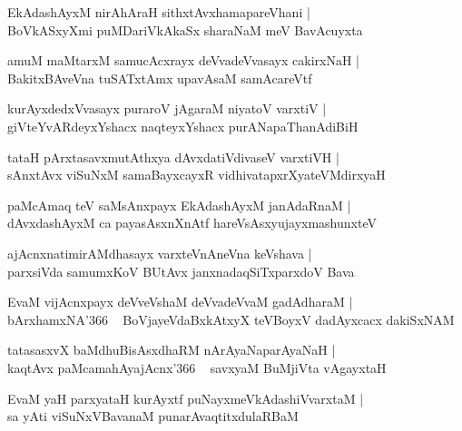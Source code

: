 \documentclass[twoside,12pt,openright]{book}
\newcounter{shloka}[chapter]
\begin{document}
\begin{shloka}%
EkAdashAyxM nirAhAraH sithxtAvxhamapareVhani |\\
BoVkASxyXmi puMDariVkAkaSx sharaNaM meV BavAcuyxta
\end{shloka}

\begin{shloka}%
amuM maMtarxM samucAcxrayx deVvadeVvasayx cakirxNaH |\\
BakitxBAveVna tuSATxtAmx upavAsaM samAcareVtf 
\end{shloka}

\begin{shloka}%
kurAyxdedxVvasayx puraroV jAgaraM niyatoV varxtiV |\\
giVteYvARdeyxYshacx naqteyxYshacx purANapaThanAdiBiH
\end{shloka}

\begin{shloka}%
tataH pArxtasavxmutAthxya dAvxdatiVdivaseV varxtiVH |\\
sAnxtAvx viSuNxM samaBayxcayxR vidhivatapxrXyateVMdirxyaH 
\end{shloka}

\begin{shloka}%
paMcAmaq teV saMsAnxpayx EkAdashAyxM janAdaRnaM |\\
dAvxdashAyxM ca payasAsxnXnAtf hareVsAsxyujayxmashunxteV 
\end{shloka}

\begin{shloka}%
ajAcnxnatimirAMdhasayx varxteVnAneVna keVshava |\\
parxsiVda samumxKoV BUtAvx janxnadaqSiTxparxdoV Bava
\end{shloka}

\begin{shloka}%
EvaM vijAcnxpayx deVveVshaM deVvadeVvaM gadAdharaM |\\
bArxhamxNA\char'366 ~ BoVjayeVdaBxkAtxyX teVBoyxV dadAyxcacx dakiSxNAM
\end{shloka}

\begin{shloka}%
tatasasxvX baMdhuBisAsxdhaRM nArAyaNaparAyaNaH |\\
kaqtAvx paMcamahAyajAcnx\char'366 ~ savxyaM BuMjiVta vAgayxtaH
\end{shloka}

\begin{shloka}%
EvaM yaH parxyataH kurAyxtf puNayxmeVkAdashiVvarxtaM |\\
sa yAti viSuNxVBavanaM punarAvaqtitxdulaRBaM
\end{shloka}
\end{document}
